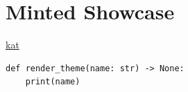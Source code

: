 \documentclass{article}
\begin{document}
\section{Minted Showcase}
\label{sec:minted}

\href{https://example.com/kat}{kat}

\begin{verbatim}
def render_theme(name: str) -> None:
    print(name)
\end{verbatim}
\end{document}
